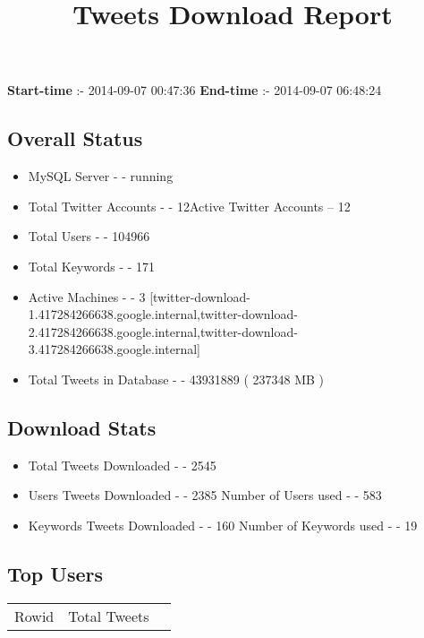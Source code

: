 \documentclass{article}\usepackage[T1]{fontenc}
\begin{document}
\title{\textbf{Tweets Download Report}}
               \date{}
                \maketitle
               \centerline{\textbf{Start-time} :- 2014-09-07 00:47:36 \hspace{40pt} \textbf{End-time} :- 2014-09-07 06:48:24}               \subsection*{Overall Status}                \begin{itemize}                \item MySQL Server - - running               \item Total Twitter Accounts - - 12\newline Active Twitter Accounts -- 12               \item Total Users - - 104966               \item Total Keywords - - 171               \item Active Machines - - 3 [twitter-download-1.417284266638.google.internal,twitter-download-2.417284266638.google.internal,twitter-download-3.417284266638.google.internal]               \item Total Tweets in Database - - 43931889 ( 237348 MB )               \end{itemize}               \subsection*{Download Stats}                \begin{itemize}                \item Total Tweets Downloaded - - 2545               \item Users Tweets Downloaded - - 2385 \newline Number of Users used - - 583               \item Keywords Tweets Downloaded - - 160 \newline Number of Keywords used - - 19              \end{itemize}              \subsection*{Top Users}\begin{tabular}{|c|c|c|}         \hline         Rowid & Total Tweets \\ 

\end{tabular}
\end{document}

